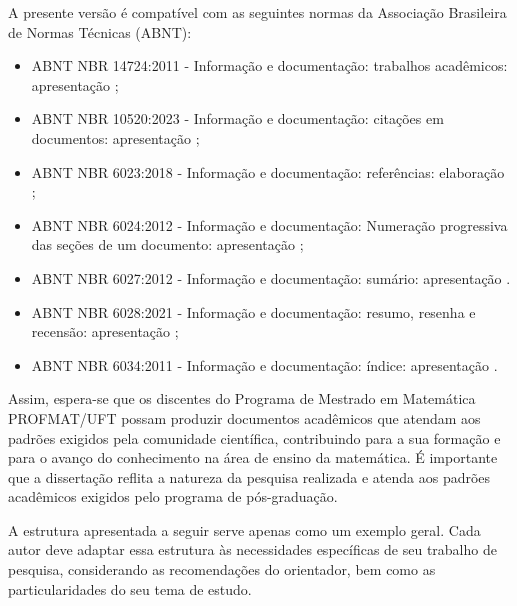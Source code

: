 A presente versão é compatível com as seguintes normas da Associação Brasileira de Normas Técnicas (ABNT):

\begin{itemize}
	\item ABNT NBR 14724:2011 - Informação
e documentação: trabalhos acadêmicos: apresentação \cite{nbr14724};

    \item ABNT NBR 10520:2023 - Informação
e documentação: citações em documentos: apresentação \cite{nbr10520};

	\item ABNT NBR 6023:2018 - Informação
e documentação: referências: elaboração \cite{nbr6023};

    \item ABNT NBR 6024:2012 - Informação
e documentação: Numeração progressiva das seções de um documento: apresentação \cite{nbr6024};
 
	

	\item ABNT NBR 6027:2012 - Informação
e documentação: sumário: apresentação \cite{nbr6027}.

    \item ABNT NBR 6028:2021 - Informação
e documentação: resumo, resenha e recensão: apresentação \cite{nbr6028};

    	\item ABNT NBR 6034:2011 - Informação
e documentação: índice: apresentação \cite{nbr6034}.
\end{itemize} 

Assim, espera-se que os discentes do Programa de Mestrado em Matemática PROFMAT/UFT possam produzir documentos acadêmicos que atendam aos padrões exigidos pela comunidade científica, contribuindo para a sua formação e para o avanço do conhecimento na área de ensino da matemática. É importante que a dissertação reflita a natureza da pesquisa realizada e atenda aos padrões acadêmicos exigidos pelo programa de pós-graduação.

A estrutura apresentada a seguir serve apenas como um exemplo geral. Cada autor deve adaptar essa estrutura às necessidades específicas de seu trabalho de pesquisa, considerando as recomendações do orientador, bem como as particularidades do seu tema de estudo. 


